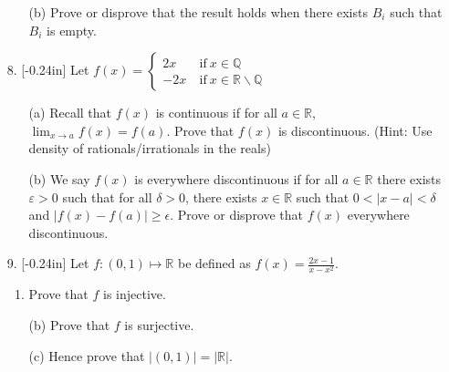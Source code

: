 \documentclass[letterpaper,12pt]{article}
\theoremstyle{definition}
\begin{document}
\pagebreak
\begin{enumerate}
    \item[] \begin{enumerate}
        \item[(b)] Prove or disprove that the result holds when there exists $B_i$ such that $B_i$ is empty.
    \end{enumerate}
\end{enumerate}
\pagebreak
\begin{enumerate}
    \item[8.] \reversemarginpar{}[-0.24in] Let $f(x) = \begin{cases}
        2x \ &\text{if} \ x \in \mathbb{Q}\\ -2x \ &\text{if} \ x\in \mathbb{R}\backslash\mathbb{Q}
    \end{cases}$  \begin{enumerate}
        \item[(a)] Recall that $f(x)$ is continuous if for all $a \in \mathbb{R}$, $\lim_{x\rightarrow a}f(x)=f(a)$. Prove that $f(x)$ is discontinuous. (Hint: Use density of rationals/irrationals in the reals)
    \end{enumerate}
\end{enumerate}
\pagebreak
\begin{enumerate}
    \item[] \begin{enumerate}
        \item[(b)] We say $f(x)$ is everywhere discontinuous if for all $a \in \mathbb{R}$ there exists $\varepsilon > 0$ such that for all $\delta > 0$, there exists $x\in\mathbb{R}$ such that $0<|x-a|<\delta$ and $|f(x)-f(a)| \geq \epsilon$. Prove or disprove that $f(x)$ everywhere discontinuous.
    \end{enumerate}
\end{enumerate}
\pagebreak
\begin{enumerate}
    \item[9.] \reversemarginpar{}[-0.24in] 
    Let $f:(0,1) \mapsto \mathbb{R}$ be defined as $f(x) = \frac{2x-1}{x-x^2}$. \begin{enumerate}
        \item Prove that $f$ is injective.
    \end{enumerate}
\end{enumerate}
\pagebreak
\begin{enumerate}
    \item[] \begin{enumerate}
        \item[(b)] Prove that $f$ is surjective.
        \vspace{6in}
        \item[(c)] Hence prove that $|(0,1)|=|\mathbb{R}|$.
    \end{enumerate}
\end{enumerate}
\end{document}
